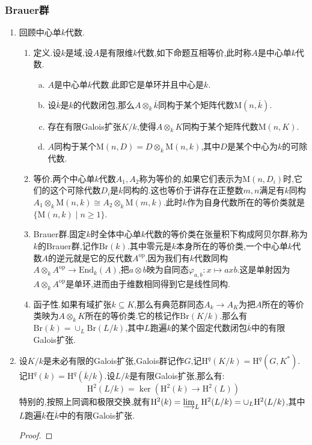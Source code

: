 \subsubsection{Brauer群}

\begin{enumerate}
	\item 回顾中心单$k$代数.
	\begin{enumerate}[(1)]
		\item 定义.设$k$是域,设$A$是有限维$k$代数,如下命题互相等价,此时称$A$是中心单$k$代数.
		\begin{enumerate}[(a)]
			\item $A$是中心单$k$代数.此即它是单环并且中心是$k$.
			\item 设$\overline{k}$是$k$的代数闭包,那么$A\otimes_k\overline{k}$同构于某个矩阵代数$\mathrm{M}(n,\overline{k})$.
			\item 存在有限Galois扩张$K/k$,使得$A\otimes_kK$同构于某个矩阵代数$\mathrm{M}(n,K)$.
			\item $A$同构于某个$\mathrm{M}(n,D)=D\otimes_k\mathrm{M}(n,k)$,其中$D$是某个中心为$k$的可除代数.
		\end{enumerate}
	    \item 等价.两个中心单$k$代数$A_1,A_2$称为等价的,如果它们表示为$\mathrm{M}(n,D_i)$时,它们的这个可除代数$D_i$是$k$同构的.这也等价于讲存在正整数$m,n$满足有$k$同构$A_1\otimes_k\mathrm{M}(n,k)\cong A_2\otimes_k\mathrm{M}(m,k)$.此时$k$作为自身代数所在的等价类就是$\{\mathrm{M}(n,k)\mid n\ge1\}$.
	    \item Brauer群.固定$k$时全体中心单$k$代数的等价类在张量积下构成阿贝尔群,称为$k$的Brauer群,记作$\mathrm{Br}(k)$.其中零元是$k$本身所在的等价类,一个中心单$k$代数$A$的逆元就是它的反代数$A^{\mathrm{op}}$,因为我们有$k$代数同构$A\otimes_kA^{\mathrm{op}}\to\mathrm{End}_k(A)$,把$a\otimes b$映为自同态$\varphi_{a,b}:x\mapsto axb$.这是单射因为$A\otimes_kA^{\mathrm{op}}$是单环,进而由于维数相同得到它是线性同构.
	    \item 函子性.如果有域扩张$k\subseteq K$,那么有典范群同态$A_k\to A_K$为把$A$所在的等价类映为$A\otimes_kK$所在的等价类.它的核记作$\mathrm{Br}(K/k)$.那么有$\mathrm{Br}(k)=\cup_L\mathrm{Br}(L/k)$,其中$L$跑遍$k$的某个固定代数闭包$\overline{k}$中的有限Galois扩张.
	\end{enumerate}
	\item 设$K/k$是未必有限的Galois扩张,Galois群记作$G$,记$\mathrm{H}^q(K/k)=\mathrm{H}^q(G,K^*)$.记$\mathrm{H}^q(k)=\mathrm{H}^q(\overline{k}/k)$.设$L/k$是有限Galois扩张,那么有:
	$$\mathrm{H}^2(L/k)=\ker(\mathrm{H}^2(k)\to\mathrm{H}^2(L))$$
	特别的,按照上同调和极限交换,就有$\mathrm{H}^2(k)=\varinjlim_L\mathrm{H}^2(L/k)=\cup_L\mathrm{H}^2(L/k)$,其中$L$跑遍$k$在$\overline{k}$中的有限Galois扩张.
	\begin{proof}
		

\end{proof}
\end{enumerate}
